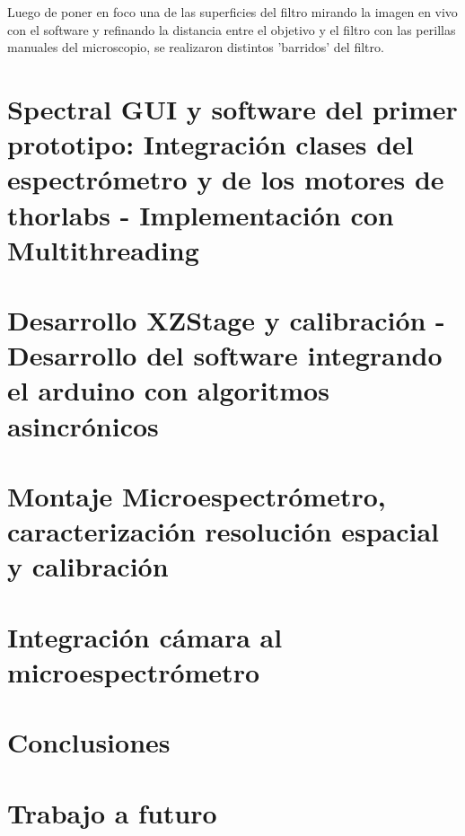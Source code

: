 \documentclass{ctuthesis}
\begin{document}
\vspace{1cm}
\vspace{1cm} 

Luego de poner en foco una de las superficies del filtro mirando la imagen en vivo con el software y refinando la distancia entre el objetivo y el filtro con las perillas manuales del microscopio, se realizaron distintos 'barridos' del filtro.






\chapter{Spectral GUI y software del primer prototipo: Integración clases del espectrómetro y de los motores de thorlabs - Implementación con Multithreading}

\chapter{Desarrollo XZStage y calibración - Desarrollo del software integrando el arduino con algoritmos asincrónicos}

\chapter{Montaje Microespectrómetro, caracterización resolución espacial y calibración}{}

\chapter{Integración cámara al microespectrómetro}



\chapter{Conclusiones}

\chapter{Trabajo a futuro}
\end{document}

